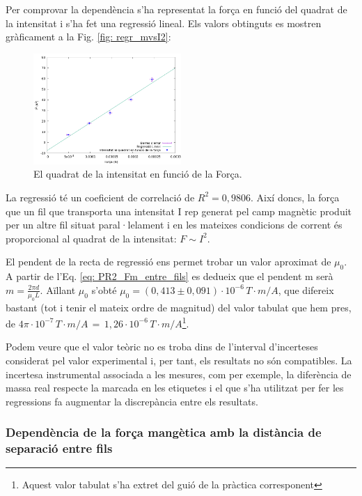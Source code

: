 \documentclass[11pt]{article}
\numberwithin{equation}{section}
\numberwithin{figure}{section}
\numberwithin{table}{section}
\begin{document}
Per comprovar la dependència s’ha representat la força en funció del quadrat de la intensitat i s’ha fet una regressió lineal. Els
valors obtinguts es mostren gràficament a la Fig. \ref{fig: regr_mvsI2}:

\begin{figure}[H]
    \centering
    \includegraphics[width=0.5\textwidth]{PR2_regr_I2vsF.png}
    \caption{El quadrat de la intensitat en funció de la Força.}
    \label{fig: PR2_regr_I2vsF}
\end{figure}

La regressió té un coeficient de correlació de $R^2 = 0,9806$. Així doncs, la força que un fil que transporta una intensitat I rep generat pel camp magnètic produit per un altre fil situat paral·lelament i en les mateixes condicions de corrent és proporcional al quadrat de la intensitat: $F \sim I^2$.

El pendent de la recta de regressió ens permet trobar un valor aproximat de $\mu_0$. A partir de l’Eq. \eqref{eq: PR2_Fm_entre_fils} es dedueix que el pendent m serà $m = \frac{2\pi d}{\mu_0 L}$.
Aïllant $\mu_0$ s’obté $\mu_0 = (0,413 \pm 0,091) · 10^{-6}\, T · m/A$, que difereix bastant (tot i tenir el mateix ordre de magnitud) del valor tabulat que hem pres, de $4\pi \cdot 10^{-7}\, T \cdot m/A \,=\, 1,26 \cdot 10^{-6}\, T\cdot m/A$\footnote{Aquest valor tabulat s'ha extret del guió de la pràctica corresponent}. 

Podem veure que el valor teòric no es troba dins de l’interval d’incerteses considerat pel valor experimental i, per tant, els resultats no són compatibles. La incertesa instrumental associada a les mesures, com per exemple, la diferència de massa real respecte la marcada en les etiquetes i el que s'ha utilitzat per fer les regressions fa augmentar la discrepància entre els resultats. 

\subsubsection{Dependència de la força mangètica amb la distància de separació entre fils}\label{sec: PR2_Fm_sep}
\end{document}
